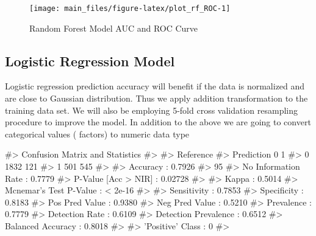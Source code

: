 \begin{Schunk}
\begin{figure}[H]

{\centering \texttt{[image: main\_files/figure-latex/plot\_rf\_ROC-1]} 

}

\caption[Random Forest Model AUC and ROC Curve]{Random Forest Model AUC and ROC Curve}\label{fig:plot_rf_ROC}
\end{figure}
\end{Schunk}

\hypertarget{logistic-regression-model}{%
\subsection{Logistic Regression Model}\label{logistic-regression-model}}

Logistic regression prediction accuracy will benefit if the data is
normalized and are close to Gaussian distribution. Thus we apply
addition transformation to the training data set. We will also be
employing 5-fold cross validation resampling procedure to improve the
model. In addition to the above we are going to convert categorical
values ( factors) to numeric data type

\begin{Schunk}
\begin{Soutput}
#> Confusion Matrix and Statistics
#> 
#>           Reference
#> Prediction    0    1
#>          0 1832  121
#>          1  501  545
#>                                          
#>                Accuracy : 0.7926         
#>                  95%
#>     No Information Rate : 0.7779         
#>     P-Value [Acc > NIR] : 0.02728        
#>                                          
#>                   Kappa : 0.5014         
#>  Mcnemar's Test P-Value : < 2e-16        
#>                                          
#>             Sensitivity : 0.7853         
#>             Specificity : 0.8183         
#>          Pos Pred Value : 0.9380         
#>          Neg Pred Value : 0.5210         
#>              Prevalence : 0.7779         
#>          Detection Rate : 0.6109         
#>    Detection Prevalence : 0.6512         
#>       Balanced Accuracy : 0.8018         
#>                                          
#>        'Positive' Class : 0              
#> 
\end{Soutput}
\end{Schunk}

